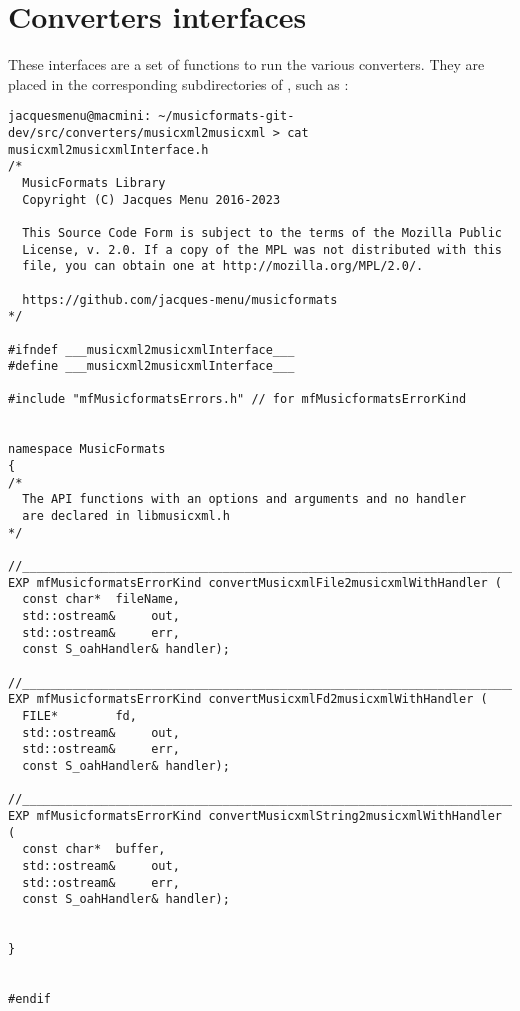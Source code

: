
\chapter{Converters interfaces}

These interfaces are a set of functions to run the various converters. They are placed in the corresponding subdirectories of \converters, such as :
\begin{lstlisting}[language=Terminal]
jacquesmenu@macmini: ~/musicformats-git-dev/src/converters/musicxml2musicxml > cat musicxml2musicxmlInterface.h
/*
  MusicFormats Library
  Copyright (C) Jacques Menu 2016-2023

  This Source Code Form is subject to the terms of the Mozilla Public
  License, v. 2.0. If a copy of the MPL was not distributed with this
  file, you can obtain one at http://mozilla.org/MPL/2.0/.

  https://github.com/jacques-menu/musicformats
*/

#ifndef ___musicxml2musicxmlInterface___
#define ___musicxml2musicxmlInterface___

#include "mfMusicformatsErrors.h" // for mfMusicformatsErrorKind


namespace MusicFormats
{
/*
  The API functions with an options and arguments and no handler
  are declared in libmusicxml.h
*/

//_______________________________________________________________________________
EXP mfMusicformatsErrorKind convertMusicxmlFile2musicxmlWithHandler (
  const char*  fileName,
  std::ostream&     out,
  std::ostream&     err,
  const S_oahHandler& handler);

//_______________________________________________________________________________
EXP mfMusicformatsErrorKind convertMusicxmlFd2musicxmlWithHandler (
  FILE*        fd,
  std::ostream&     out,
  std::ostream&     err,
  const S_oahHandler& handler);

//_______________________________________________________________________________
EXP mfMusicformatsErrorKind convertMusicxmlString2musicxmlWithHandler (
  const char*  buffer,
  std::ostream&     out,
  std::ostream&     err,
  const S_oahHandler& handler);


}


#endif
\end{lstlisting}


